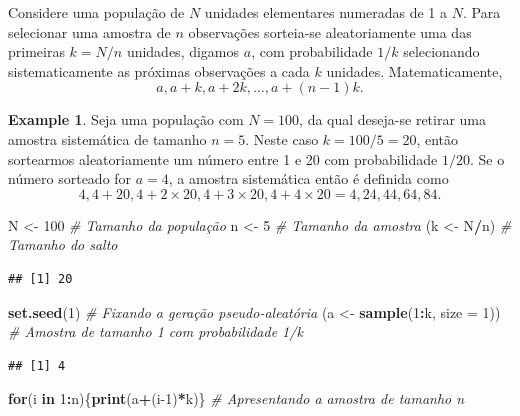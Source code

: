 \documentclass[
]{book}
\newenvironment{Shaded}{\begin{snugshade}}{\end{snugshade}}
\newcommand{\CommentTok}[1]{\textcolor[rgb]{0.56,0.35,0.01}{\textit{#1}}}
\newcommand{\ControlFlowTok}[1]{\textcolor[rgb]{0.13,0.29,0.53}{\textbf{#1}}}
\newcommand{\DataTypeTok}[1]{\textcolor[rgb]{0.13,0.29,0.53}{#1}}
\newcommand{\DecValTok}[1]{\textcolor[rgb]{0.00,0.00,0.81}{#1}}
\newcommand{\KeywordTok}[1]{\textcolor[rgb]{0.13,0.29,0.53}{\textbf{#1}}}
\newcommand{\NormalTok}[1]{#1}
\newcommand{\OperatorTok}[1]{\textcolor[rgb]{0.81,0.36,0.00}{\textbf{#1}}}
\newcommand{\StringTok}[1]{\textcolor[rgb]{0.31,0.60,0.02}{#1}}
\theoremstyle{definition}
\theoremstyle{definition}
\newtheorem{example}{Example}[chapter]
\theoremstyle{definition}
\theoremstyle{remark}
\begin{document}
Considere uma população de \(N\) unidades elementares numeradas de 1 a \(N\). Para selecionar uma amostra de \(n\) observações sorteia-se aleatoriamente uma das primeiras \(k=N/n\) unidades, digamos \(a\), com probabilidade \(1/k\) selecionando sistematicamente as próximas observações a cada \(k\) unidades. Matematicamente, \[a, a+k, a+2k, \ldots, a+(n-1)k.\]

\begin{example}
\protect\hypertarget{exm:as}{}{\label{exm:as} }Seja uma população com \(N=100\), da qual deseja-se retirar uma amostra sistemática de tamanho \(n=5\). Neste caso \(k=100/5=20\), então sortearmos aleatoriamente um número entre 1 e 20 com probabilidade \(1/20\). Se o número sorteado for \(a=4\), a amostra sistemática então é definida como \[4, 4+20, 4+2 \times 20, 4+3 \times 20, 4+4 \times 20 = 4,24,44,64,84.\]
\end{example}

\begin{Shaded}
\begin{Highlighting}[]
\NormalTok{N \textless{}{-}}\StringTok{ }\DecValTok{100} \CommentTok{\# Tamanho da população}
\NormalTok{n \textless{}{-}}\StringTok{ }\DecValTok{5} \CommentTok{\# Tamanho da amostra}
\NormalTok{(k \textless{}{-}}\StringTok{ }\NormalTok{N}\OperatorTok{/}\NormalTok{n) }\CommentTok{\# Tamanho do salto}
\end{Highlighting}
\end{Shaded}

\begin{verbatim}
## [1] 20
\end{verbatim}

\begin{Shaded}
\begin{Highlighting}[]
\KeywordTok{set.seed}\NormalTok{(}\DecValTok{1}\NormalTok{) }\CommentTok{\# Fixando a geração pseudo{-}aleatória}
\NormalTok{(a \textless{}{-}}\StringTok{ }\KeywordTok{sample}\NormalTok{(}\DecValTok{1}\OperatorTok{:}\NormalTok{k, }\DataTypeTok{size =} \DecValTok{1}\NormalTok{)) }\CommentTok{\# Amostra de tamanho 1 com probabilidade 1/k}
\end{Highlighting}
\end{Shaded}

\begin{verbatim}
## [1] 4
\end{verbatim}

\begin{Shaded}
\begin{Highlighting}[]
\ControlFlowTok{for}\NormalTok{(i }\ControlFlowTok{in} \DecValTok{1}\OperatorTok{:}\NormalTok{n)\{}\KeywordTok{print}\NormalTok{(a}\OperatorTok{+}\NormalTok{(i}\DecValTok{{-}1}\NormalTok{)}\OperatorTok{*}\NormalTok{k)\} }\CommentTok{\# Apresentando a amostra de tamanho n}
\end{Highlighting}
\end{Shaded}
\end{document}

